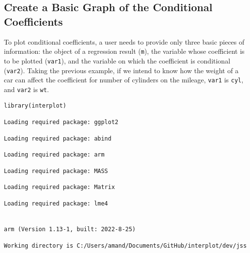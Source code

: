 \documentclass[
  article]{jss}
\begin{document}
\hypertarget{sec-create-a-basic-graph-of-the-conditional-coefficients}{%
\subsection{Create a Basic Graph of the Conditional
Coefficients}\label{sec-create-a-basic-graph-of-the-conditional-coefficients}}

To plot conditional coefficients, a user needs to provide only three
basic pieces of information: the object of a regression result
(\texttt{m}), the variable whose coefficient is to be plotted
(\texttt{var1}), and the variable on which the coefficient is
conditional (\texttt{var2}). Taking the previous example, if we intend
to know how the weight of a car can affect the coefficient for number of
cylinders on the mileage, \texttt{var1} is \texttt{cyl}, and
\texttt{var2} is \texttt{wt}.

\begin{verbatim}
library(interplot)
\end{verbatim}

\begin{verbatim}
Loading required package: ggplot2
\end{verbatim}

\begin{verbatim}
Loading required package: abind
\end{verbatim}

\begin{verbatim}
Loading required package: arm
\end{verbatim}

\begin{verbatim}
Loading required package: MASS
\end{verbatim}

\begin{verbatim}
Loading required package: Matrix
\end{verbatim}

\begin{verbatim}
Loading required package: lme4
\end{verbatim}

\begin{verbatim}

arm (Version 1.13-1, built: 2022-8-25)
\end{verbatim}

\begin{verbatim}
Working directory is C:/Users/amand/Documents/GitHub/interplot/dev/jss
\end{verbatim}
\end{document}
